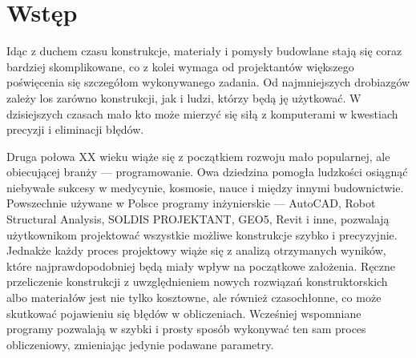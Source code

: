\newpage
{}
\section*{Wstęp}

Idąc z duchem czasu konstrukcje, materiały i pomysły budowlane stają się coraz bardziej skomplikowane, co z kolei wymaga
od projektantów większego poświęcenia się szczegółom wykonywanego zadania. Od najmniejszych drobiazgów zależy los zarówno konstrukcji, jak i ludzi,
którzy będą ję użytkować. W dzisiejszych czasach mało kto może mierzyć się siłą z komputerami w kwestiach precyzji
i eliminacji błędów.

\par Druga połowa XX wieku wiąże się z początkiem rozwoju mało popularnej, ale obiecującej branży — programowanie.
Owa dziedzina pomogła ludzkości osiągnąć niebywałe sukcesy w medycynie, kosmosie, nauce i między innymi budownictwie.
Powszechnie używane w Polsce programy inżynierskie — AutoCAD, Robot Structural Analysis, SOLDIS PROJEKTANT, GEO5, Revit i inne,
pozwalają użytkownikom projektować wszystkie możliwe konstrukcje szybko i precyzyjnie. Jednakże każdy proces projektowy wiąże się z
analizą otrzymanych wyników, które najprawdopodobniej będą miały wpływ na początkowe założenia. Ręczne przeliczenie konstrukcji z
uwzględnieniem nowych rozwiązań konstruktorskich albo materiałów jest nie tylko kosztowne, ale również czasochłonne, co może skutkować
pojawieniu się błędów w obliczeniach. Wcześniej wspomniane programy pozwalają w szybki i prosty sposób wykonywać ten sam
proces obliczeniowy, zmieniając jedynie podawane parametry.
